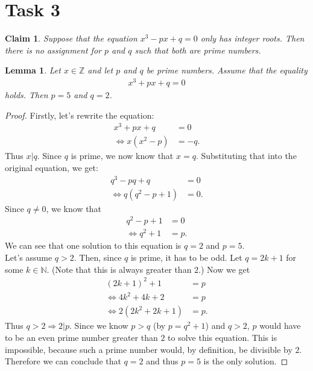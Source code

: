 \documentclass{article}
\newcommand{\N}{\mathbb{N}}
\newcommand{\Z}{\mathbb{Z}}
\newtheorem{claim}[section]{Claim}
\newtheorem{lemma}{Lemma}[section]
\begin{document}
\section*{Task 3}
\begin{claim}
  Suppose that the equation
    $x^3-px+q=0$
  only has integer roots. 
  Then there is no assignment for $p$ and $q$ such that both are prime numbers.
\end{claim}
\begin{adjustwidth}{2em}{0pt}
  \begin{lemma}
    \label{l5}
    Let $x\in\Z$ and let $p$ and $q$ be prime numbers.
    Assume that the equality
    \begin{align*}
      x^3+px+q=0
    \end{align*}
    holds. Then $p=5$ and $q=2$.
  \end{lemma}
  \begin{proof}
    Firstly, let's rewrite the equation:
    \begin{align*}
      x^3+px+q&=0\\
      \Leftrightarrow x(x^2-p)&=-q.
    \end{align*}
    Thus $x|q$. Since $q$ is prime, we now know that $x=q$. 
    Substituting that into the original equation, we get:
    \begin{align*}
      q^3-pq+q&=0\\
      \Leftrightarrow q(q^2-p+1)&=0.
    \end{align*}
    Since $q\not=0$, we know that
    \begin{align*}
      q^2-p+1&=0\\
      \Leftrightarrow q^2+1&=p.
    \end{align*}
    We can see that one solution to this equation is $q=2$ and $p=5$.\\
    Let's assume $q>2$. Then, since $q$ is prime, it has to be odd. 
    Let $q=2k+1$ for some $k\in\N$. (Note that this is always greater than $2$.) Now we get
    \begin{align*}
      (2k+1)^2+1&=p\\
      \Leftrightarrow 4k^2+4k+2&=p\\
      \Leftrightarrow 2(2k^2+2k+1)&=p.
    \end{align*}
    Thus $q>2\Rightarrow 2|p$. Since we know $p>q$ (by $p=q^2+1$) and $q>2$, $p$ would have to be an even prime number greater than $2$ to solve this equation. This is impossible, because such a prime number would, by definition, be divisible by $2$.\\
    Therefore we can conclude that $q=2$ and thus $p=5$ is the only solution.
  \end{proof}
\end{adjustwidth}
\end{document}
